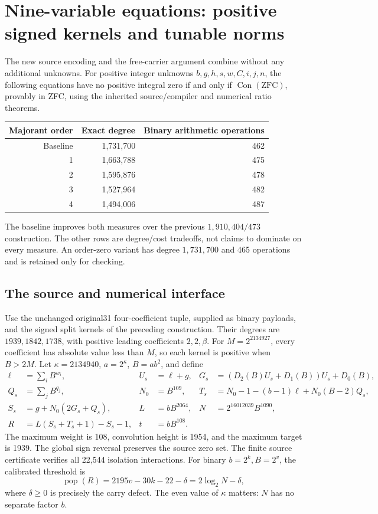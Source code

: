 \section{Nine-variable equations: positive signed kernels and tunable norms}
The new source encoding and the free-carrier argument combine without any
additional unknowns.  For positive integer unknowns
\(b,g,h,s,w,C,i,j,n\), the following equations have no positive integral
zero if and only if \(\operatorname{Con}(\mathrm{ZFC})\), provably in ZFC,
using the inherited source/compiler and numerical ratio theorems.
\begin{center}
\begin{tabular}{r|r|r}
Majorant order & Exact degree & Binary arithmetic operations\\\hline
Baseline & 1,731,700 & 462\\
1 & 1,663,788 & 475\\
2 & 1,595,876 & 478\\
3 & 1,527,964 & 482\\
4 & 1,494,006 & 487
\end{tabular}
\end{center}
The baseline improves both measures over the previous
\(1{,}910{,}404/473\) construction.  The other rows are degree/cost
tradeoffs, not claims to dominate on every measure.  An order-zero variant
has degree \(1{,}731{,}700\) and 465 operations and is retained only for checking.

\subsection{The source and numerical interface}
Use the unchanged original31 four-coefficient tuple, supplied as binary
payloads, and the signed split kernels of the preceding construction.
Their degrees are \(1939,1842,1738\), with positive leading coefficients
\(2,2,\beta\).  For \(M=2^{2134927}\), every coefficient has absolute
value less than \(M\), so each kernel is positive when \(B>2M\).
Let \(\kappa=2134940\), \(a=2^\kappa\), \(B=ab^2\), and define
\begin{align*}
 \ell&=\sum_i B^{w_i},& U_s&=\ell+g,&
 G_s&=(D_2(B)U_s+D_1(B))U_s+D_0(B),\\
 Q_s&=\sum_j B^{q_j},& N_0&=B^{109},&
 T_s&=N_0-1-(b-1)\ell+N_0(B-2)Q_s,\\
 S_s&=g+N_0(2G_s+Q_s),& L&=bB^{2064},&
 N&=2^{16012039}B^{1090},\\
 R&=L(S_s+T_s+1)-S_s-1,&t&=bB^{108}.&&
\end{align*}
The maximum weight is 108, convolution height is 1954, and the maximum
target is 1939.  The global sign reversal preserves the source zero set.
The finite source certificate verifies all 22,544 isolation interactions.
For binary \(b=2^k,B=2^v\), the calibrated threshold is
\[
 \operatorname{pop}(R)=2195v-30k-22-\delta
                      =2\log_2 N-\delta,
\]
where \(\delta\ge0\) is precisely the carry defect.  The even value of
\(\kappa\) matters: \(N\) has no separate factor \(b\).

